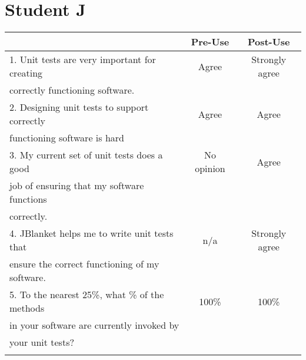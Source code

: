 \pagebreak

\section{Student J}

\begin{tabular}{lcc} \\
 & {\bf Pre-Use} & {\bf Post-Use} \\ \hline
1. Unit tests are very important for creating & Agree & Strongly agree \\
   correctly functioning software. \\ \hline

2. Designing unit tests to support correctly & Agree & Agree \\
   functioning software is hard\\ \hline

3. My current set of unit tests does a good & No opinion & Agree \\
   job of ensuring that my software functions \\
   correctly.\\ \hline

4. JBlanket helps me to write unit tests that & n/a & Strongly agree \\
   ensure the correct functioning of my software.\\ \hline

5. To the nearest 25\%, what \% of the methods & 100\% & 100\% \\
   in your software are currently invoked by \\
   your unit tests?\\ \hline
\\
\end{tabular}

